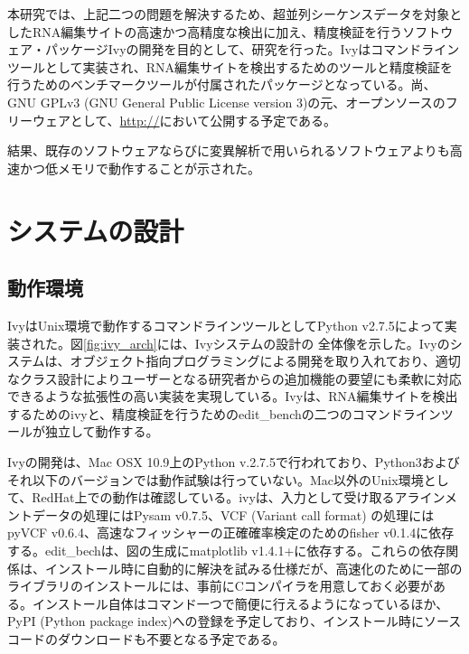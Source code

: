 \par
本研究では、上記二つの問題を解決するため、超並列シーケンスデータを対象としたRNA編集サイトの高速かつ高精度な検出に加え、精度検証を行うソフトウェア・パッケージIvyの開発を目的として、研究を行った。Ivyはコマンドラインツールとして実装され、RNA編集サイトを検出するためのツールと精度検証を行うためのベンチマークツールが付属されたパッケージとなっている。尚、GNU GPLv3 (GNU General Public License version 3)の元、オープンソースのフリーウェアとして、\url{http://}において公開する予定である。
\par
結果、既存のソフトウェアならびに変異解析で用いられるソフトウェアよりも高速かつ低メモリで動作することが示された。

\section{システムの設計}
\subsection{動作環境}
IvyはUnix環境で動作するコマンドラインツールとしてPython v2.7.5によって実装された。図\ref{fig:ivy_arch}には、Ivyシステムの設計の
全体像を示した。Ivyのシステムは、オブジェクト指向プログラミングによる開発を取り入れており、適切なクラス設計によりユーザーとなる研究者からの追加機能の要望にも柔軟に対応できるような拡張性の高い実装を実現している。Ivyは、RNA編集サイトを検出するためのivyと、精度検証を行うためのedit\_benchの二つのコマンドラインツールが独立して動作する。
\par
Ivyの開発は、Mac OSX 10.9上のPython v.2.7.5で行われており、Python3およびそれ以下のバージョンでは動作試験は行っていない。Mac以外のUnix環境として、RedHat上での動作は確認している。ivyは、入力として受け取るアラインメントデータの処理にはPysam v0.7.5、VCF (Variant call format) \citep{Danecek:2011aa}の処理にはpyVCF v0.6.4、高速なフィッシャーの正確確率検定のためのfisher v0.1.4に依存する。edit\_bechは、図の生成にmatplotlib v1.4.1+に依存する。これらの依存関係は、インストール時に自動的に解決を試みる仕様だが、高速化のために一部のライブラリのインストールには、事前にCコンパイラを用意しておく必要がある。インストール自体はコマンド一つで簡便に行えるようになっているほか、PyPI (Python package index)への登録を予定しており、インストール時にソースコードのダウンロードも不要となる予定である。

